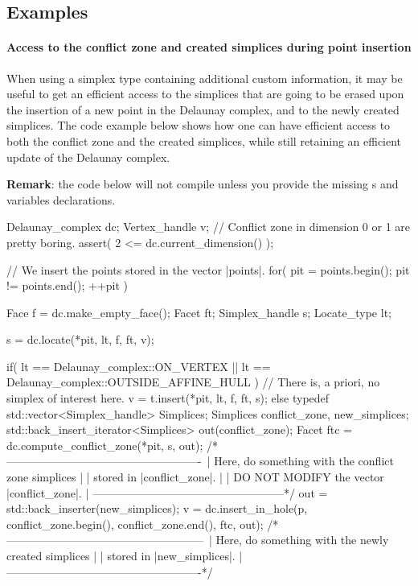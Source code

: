 {{%

\subsection{Examples}

\paragraph{Access to the conflict zone and created simplices during point
insertion}

When using a simplex type containing additional custom information, it may be
useful to get an efficient access to the simplices that are going to be erased
upon the insertion of a new point in the Delaunay complex, and to the newly
created simplices. The code example below shows how one can have efficient
access to both the conflict zone and the created simplices, while still
retaining an efficient update of the Delaunay complex.

\textbf{Remark}: the code below will not compile unless you provide the
missing s and variables declarations.

\begin{ccExampleCode}
Delaunay_complex dc;
Vertex_handle v;
// Conflict zone in dimension 0 or 1 are pretty boring.
assert( 2 <= dc.current_dimension() );

// We insert the points stored in the vector |points|.
for( pit = points.begin(); pit != points.end(); ++pit )
{
    Face           f = dc.make_empty_face();
    Facet          ft;
    Simplex_handle s;
    Locate_type    lt;

    s = dc.locate(*pit, lt, f, ft, v);

    if(    lt == Delaunay_complex::ON_VERTEX
        || lt == Delaunay_complex::OUTSIDE_AFFINE_HULL )
    {
        // There is, a priori, no simplex of interest here.
        v = t.insert(*pit, lt, f, ft, s);
    }
    else
    {
        typedef std::vector<Simplex_handle> Simplices;
        Simplices conflict_zone, new_simplices;
        std::back_insert_iterator<Simplices> out(conflict_zone);
        Facet ftc = dc.compute_conflict_zone(*pit, s, out);
        /*----------------------------------------------------\
        | Here, do something with the conflict zone simplices |
        | stored in |conflict_zone|.                          |
        | DO NOT MODIFY the vector |conflict_zone|.           |
        \----------------------------------------------------*/
        out = std::back_inserter(new_simplices);
        v = dc.insert_in_hole(p, conflict_zone.begin(), conflict_zone.end(), ftc, out);
        /*-----------------------------------------------------\
        |  Here, do something with the newly created simplices |
        |  stored in |new_simplices|.                          |
        \-----------------------------------------------------*/
    }
}
\end{ccExampleCode}

}}
